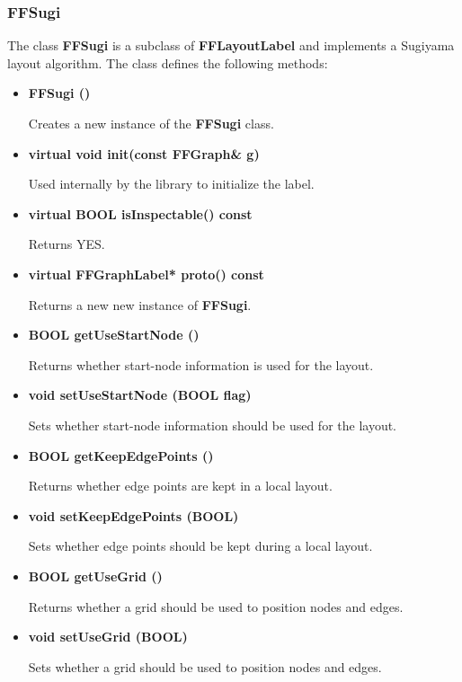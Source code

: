 \subsubsection{FFSugi}
\label{ffsugi}

The class {\bf FFSugi} is a subclass of {\bf FFLayoutLabel} and
implements a Sugiyama layout algorithm. The class defines the
following methods:

\begin{itemize}

\item{\bf FFSugi ()}

Creates a new instance of the {\bf FFSugi} class.

\item{\bf virtual void init(const FFGraph\& g)}

Used internally by the library to initialize the label.   

\item{\bf virtual BOOL isInspectable() const}

Returns YES.

\item{\bf virtual FFGraphLabel* proto() const}

Returns a new new instance of {\bf FFSugi}.
  
\item{\bf BOOL getUseStartNode ()}

Returns whether start-node information is used for the layout.

\item{\bf void setUseStartNode (BOOL flag)}

Sets whether start-node information should be used for the layout.

\item{\bf BOOL getKeepEdgePoints ()}

Returns whether edge points are kept in a local layout.

\item{\bf void setKeepEdgePoints (BOOL)}

Sets whether edge points should be kept during a local layout.
 
\item{\bf BOOL getUseGrid ()}

Returns whether a grid should be used to position nodes and edges.

\item{\bf void setUseGrid (BOOL)}

Sets whether a grid should be used to position nodes and edges.
 

\end{itemize}
